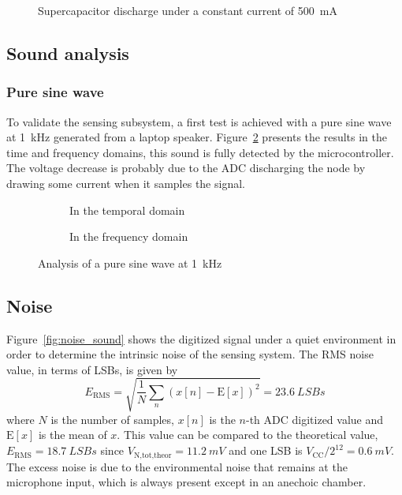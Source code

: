 \documentclass{EPL-master-thesis-covers-EN}
\newcommand{\te}[1]{\textrm{#1}}
\begin{document}
\begin{figure}[H]
    \centering
    
    \caption{Supercapacitor discharge under a constant current of \SI{500}{mA}}
    \label{fig:discharge_supercap_exp}
\end{figure}


\subsection*{Sound analysis}

\subsubsection*{Pure sine wave}

To validate the sensing subsystem, a first test is achieved with a pure sine wave at \SI{1}{kHz} generated from a laptop speaker. Figure~\ref{fig:sine_sound} presents the results in the time and frequency domains, this sound is fully detected by the microcontroller. The voltage decrease is probably due to the ADC discharging the node by drawing some current when it samples the signal.

\begin{figure}[H]
\begin{subfigure}{.5\textwidth}
  \centering
  
  \caption{In the temporal domain}
\end{subfigure}
\begin{subfigure}{.48\textwidth}
  \centering
  
  \caption{In the frequency domain}
\end{subfigure}
\caption{Analysis of a pure sine wave at \SI{1}{kHz}}
\label{fig:sine_sound}
\end{figure}


\subsection*{Noise}

Figure~\ref{fig:noise_sound} shows the digitized signal under a quiet environment in order to determine the intrinsic noise of the sensing system. The RMS noise value, in terms of LSBs, is given by
\[
 E_\te{RMS} = \sqrt{\frac{1}{N}\sum_n{\left(x[n]-\te{E}[x]\right)^2}} = \SI{23.6}{LSBs}
\]
where $N$ is the number of samples, $x[n]$ is the $n$-th ADC digitized value and $\te{E}[x]$ is the mean of $x$. This value can be compared to the theoretical value, $E_\te{RMS} = \SI{18.7}{LSBs}$ since $V_\te{N,tot,theor} = \SI{11.2}{mV}$ and one LSB is $V_\te{CC} / 2^{12} = \SI{0.6}{mV}$. The excess noise is due to the environmental noise that remains at the microphone input, which is always present except in an anechoic chamber.
\end{document}
